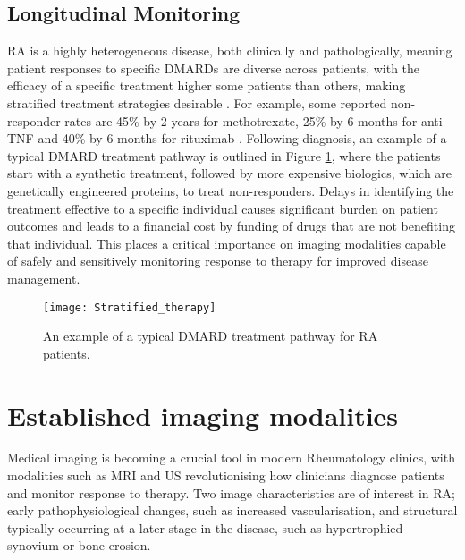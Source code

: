 \documentclass[twoside]{bhamthesis}
\theoremstyle{definition}
\begin{document}

\subsection{Longitudinal Monitoring}
\label{Longitudinal Monitoring of Response to Therapy}

RA is a highly heterogeneous disease, both clinically and pathologically, meaning patient responses to specific DMARDs are diverse across patients, with the efficacy of a specific treatment higher some patients than others, making stratified treatment strategies desirable \cite{barton2016stratified}. For example, some reported non-responder rates are 45\% by 2 years for methotrexate, 25\% by 6 months for anti-TNF and 40\% by 6 months for rituximab \cite{barrera2002drug,hyrich2006predictors,soliman2011impact}. Following diagnosis, an example of a typical DMARD treatment pathway is outlined in Figure \ref{fig:strat_therapy}, where the patients start with a synthetic treatment, followed by more expensive biologics, which are genetically engineered proteins, to treat non-responders. Delays in identifying the treatment effective to a specific individual causes significant burden on patient outcomes and leads to a financial cost by funding of drugs that are not benefiting that individual. This places a critical importance on imaging modalities capable of safely and sensitively monitoring response to therapy for improved disease management.

\begin{figure}[!ht]
\centering\texttt{[image: Stratified\_therapy]}
\caption{An example of a typical DMARD treatment pathway for RA patients.}
  \label{fig:strat_therapy}
\end{figure}

\section{Established imaging modalities}

Medical imaging is becoming a crucial tool in modern Rheumatology clinics, with modalities such as MRI and US revolutionising how clinicians diagnose patients and monitor response to therapy. Two image characteristics are of interest in RA; early pathophysiological changes, such as increased vascularisation, and structural typically occurring at a later stage in the disease, such as hypertrophied synovium or bone erosion. 
\end{document}
